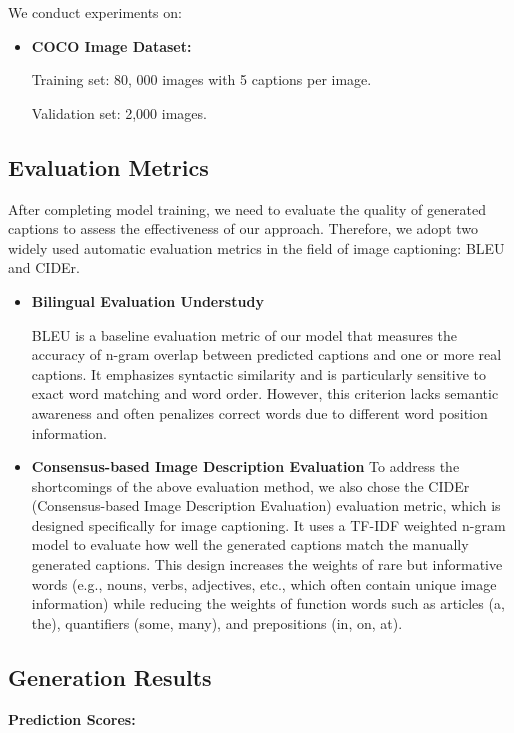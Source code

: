 \documentclass[11pt]{article}
\begin{document}
We conduct experiments on:
\begin{itemize}
  \item \textbf{COCO Image Dataset:}
  
  Training set: 80, 000 images with 5 captions per image.

  Validation set: 2,000 images.
  
\end{itemize}

\subsection{Evaluation Metrics}
After completing model training, we need to evaluate the quality of generated captions to assess the effectiveness of our approach. Therefore, we adopt two widely used 
automatic evaluation metrics in the field of image captioning: BLEU and CIDEr.
\begin{itemize}
    \item \textbf{Bilingual Evaluation Understudy }
    
    BLEU is a baseline evaluation 
    metric of our model that measures the accuracy of n-gram overlap between predicted captions 
    and one or more real captions\cite{Papineni}. It emphasizes syntactic similarity and is particularly sensitive to exact word 
    matching and word order. However, this criterion lacks semantic awareness and often penalizes correct words due to different word position information.

    \item \textbf{Consensus-based Image Description Evaluation}
    To address the shortcomings of the above evaluation method, we also chose the CIDEr
     (Consensus-based Image Description Evaluation) \cite{vedantam2015cider}
     evaluation metric, which is designed specifically for image 
     captioning. It uses a TF-IDF weighted n-gram model to evaluate how well the 
     generated captions match the manually generated captions. This design increases the 
     weights of rare but informative words (e.g., nouns, verbs, adjectives, etc., which often contain unique image information) 
     while reducing the weights of function words such as articles (a, the), quantifiers (some, many), and prepositions (in, on, at).
\end{itemize}

\pagebreak
\subsection{Generation Results}
\textbf{Prediction Scores:}
\end{document}
